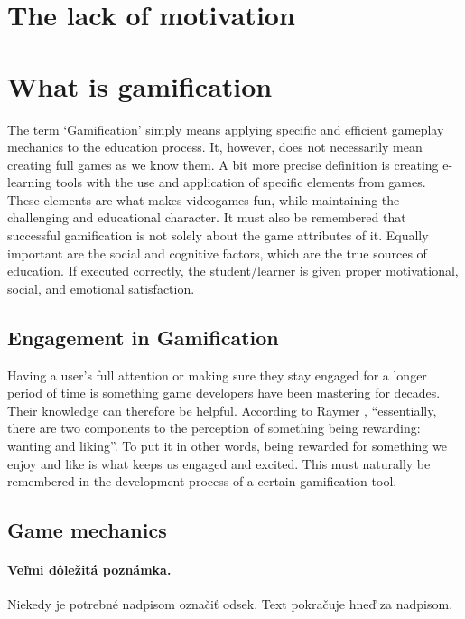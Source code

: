 \documentclass[10pt,twoside,english,a4paper]{article}
\begin{document}
\section{The lack of motivation} \label{section2}




\section{What is gamification} \label{section3}
	The term ‘Gamification’ simply means applying specific and efficient gameplay mechanics to the education process. It, however, does not necessarily mean creating full games as we know them.\cite{Raymer}
	A bit more precise definition is creating e-learning tools with the use and application of specific elements from games. These elements are what makes videogames fun, while maintaining the challenging and educational character.\cite{Abu-Dawood} 
	It must also be remembered that successful gamification is not solely about the game attributes of it. Equally important are the social and cognitive factors, which are the true sources of education. \cite{Raymer}
	If executed correctly, the student/learner is given proper motivational, social, and emotional satisfaction.\cite{Abu-Dawood} 

\subsection{Engagement in Gamification} \label{section3:1}
	Having a user’s full attention or making sure they stay engaged for a longer period of time is something game developers have been mastering for decades. 
	Their knowledge can therefore be helpful. 
	According to Raymer \cite{Raymer}, “essentially, there are two components to the perception of something being rewarding: wanting and liking”. 
	To put it in other words, being rewarded for something we enjoy and like is what keeps us engaged and excited. This must naturally be remembered in the development process of a certain gamification tool.\cite{Raymer}

\subsection{Game mechanics} \label{section3:2}
	
\paragraph{Veľmi dôležitá poznámka.}
Niekedy je potrebné nadpisom označiť odsek. Text pokračuje hneď za nadpisom.
\end{document}

